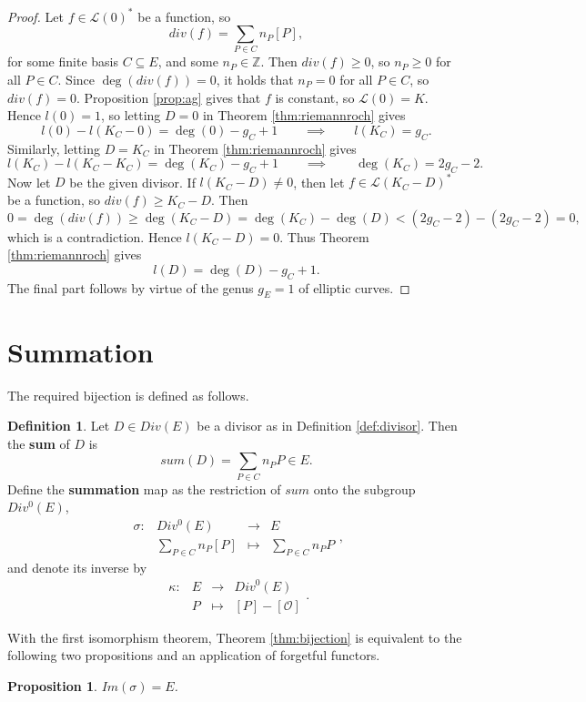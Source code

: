 \documentclass{article}
\theoremstyle{plain}
\newtheorem{proposition}[n]{Proposition}
\theoremstyle{definition}
\newtheorem{definition}[n]{Definition}
\newcommand{\function}[5][]{
  \begin{array}{crcl}
    #1 : & #2 & \to     & #3 \\
         & #4 & \mapsto & #5
  \end{array}
}
\newcommand{\rb}[1]{\left( #1 \right)}
\renewcommand{\sb}[1]{\left[ #1 \right]}
\newcommand{\Z}{\mathbb{Z}}
\newcommand{\LL}{\mathcal{L}}
\newcommand{\OO}{\mathcal{O}}
\begin{document}
\begin{proof}
Let $ f \in \LL\rb{0}^* $ be a function, so
$$ div\rb{f} = \sum_{P \in C} n_P\sb{P}, $$
for some finite basis $ C \subseteq E $, and some $ n_P \in \Z $. Then $ div\rb{f} \ge 0 $, so $ n_P \ge 0 $ for all $ P \in C $. Since $ \deg\rb{div\rb{f}} = 0 $, it holds that $ n_P = 0 $ for all $ P \in C $, so $ div\rb{f} = 0 $. Proposition \ref{prop:ag} gives that $ f $ is constant, so $ \LL\rb{0} = K $. Hence $ l\rb{0} = 1 $, so letting $ D = 0 $ in Theorem \ref{thm:riemannroch} gives
$$ l\rb{0} - l\rb{K_C - 0} = \deg\rb{0} - g_C + 1 \qquad \implies \qquad l\rb{K_C} = g_C. $$
Similarly, letting $ D = K_C $ in Theorem \ref{thm:riemannroch} gives
$$ l\rb{K_C} - l\rb{K_C - K_C} = \deg\rb{K_C} - g_C + 1 \qquad \implies \qquad \deg\rb{K_C} = 2g_C - 2. $$
Now let $ D $ be the given divisor. If $ l\rb{K_C - D} \ne 0 $, then let $ f \in \LL\rb{K_C - D}^* $ be a function, so $ div\rb{f} \ge K_C - D $. Then
$$ 0 = \deg\rb{div\rb{f}} \ge \deg\rb{K_C - D} = \deg\rb{K_C} - \deg\rb{D} < \rb{2g_C - 2} - \rb{2g_C - 2} = 0, $$
which is a contradiction. Hence $ l\rb{K_C - D} = 0 $. Thus Theorem \ref{thm:riemannroch} gives
$$ l\rb{D} = \deg\rb{D} - g_C + 1. $$
The final part follows by virtue of the genus $ g_E = 1 $ of elliptic curves.
\end{proof}

\section{Summation}

The required bijection is defined as follows.

\begin{definition}
Let $ D \in Div\rb{E} $ be a divisor as in Definition \ref{def:divisor}. Then the \textbf{sum} of $ D $ is
$$ sum\rb{D} = \sum_{P \in C} n_PP \in E. $$
Define the \textbf{summation} map as the restriction of $ sum $ onto the subgroup $ Div^0\rb{E} $,
$$ \function[\sigma]{Div^0\rb{E}}{E}{\sum_{P \in C} n_P\sb{P}}{\sum_{P \in C} n_PP}, $$
and denote its inverse by
$$ \function[\kappa]{E}{Div^0\rb{E}}{P}{\sb{P} - \sb{\OO}}. $$
\end{definition}

With the first isomorphism theorem, Theorem \ref{thm:bijection} is equivalent to the following two propositions and an application of forgetful functors.

\begin{proposition}
\label{prop:image}
$ Im\rb{\sigma} = E $.
\end{proposition}
\end{document}
